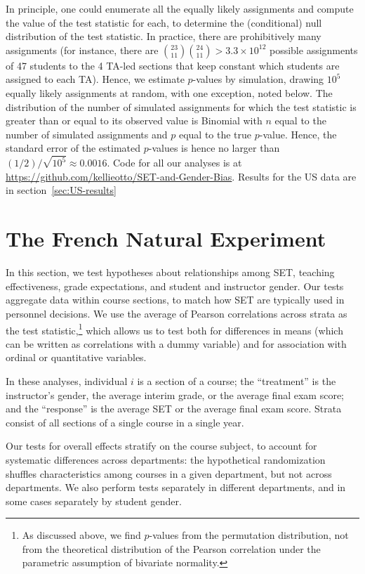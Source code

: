 \documentclass[12pt]{article}
\begin{document}
In principle, one could enumerate all the equally likely assignments and compute the value
of the test statistic for each, to determine the (conditional) null distribution of the test
statistic.
In practice, there are prohibitively many assignments
(for instance, there are ${{23}\choose{11}}{{24}\choose{11}} > 3.3\times 10^{12}$ 
possible assignments
of 47 students to the 4 TA-led sections that keep constant which
students are assigned to each TA).
Hence, we estimate $p$-values by simulation, drawing $10^5$ equally likely assignments
at random, with one exception, noted below.
The distribution of the number of simulated assignments for which the test statistic
is greater than or equal to its observed value is Binomial with $n$ equal to the number of
simulated assignments and $p$ equal to the true $p$-value.
Hence, the standard error of the estimated $p$-values is hence no larger than 
$(1/2)/ \sqrt{10^5}
\approx 0.0016$.
Code for all our analyses is at \url{https://github.com/kellieotto/SET-and-Gender-Bias}.
Results for the US data are in section~\ref{sec:US-results}

\section{The French Natural Experiment} \label{sec:Fr-results}
In this section, we test hypotheses about relationships among
SET, teaching effectiveness, grade expectations, and student and instructor gender.
Our tests aggregate data within course sections, to match how SET are typically
used in personnel decisions. 
We use the average of Pearson correlations across strata as the test statistic,\footnote{%
   As discussed above, we find $p$-values from the permutation distribution, not from
   the theoretical distribution of the Pearson correlation 
   under the parametric assumption of bivariate normality.
} 
which allows us to test both for 
differences in means (which can be written as correlations with a dummy variable) and for 
association with ordinal or quantitative variables.

In these analyses, individual $i$ is a section of a course; 
the ``treatment'' is the instructor's gender, 
the average interim grade, or the average final exam score;
and the ``response'' is the average SET or the average final exam score.
Strata consist of all sections of a single course in a single year.

Our tests for overall effects stratify on the course subject, to account for systematic
differences across departments:
the hypothetical randomization shuffles characteristics among courses in a given
department, but not across departments.
We also perform tests separately in different departments, and in some cases separately by
student gender.
\end{document}

